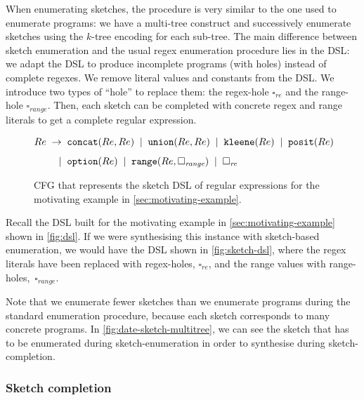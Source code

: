 When enumerating sketches, the procedure is very similar to the one used to enumerate programs: we have a multi-tree construct and successively enumerate sketches using the \(k\)-tree encoding for each sub-tree. 
The main difference between sketch enumeration and the usual regex enumeration procedure lies in the \ac{DSL}: we adapt the \ac{DSL} to produce incomplete programs (with holes) instead of complete regexes. 
We remove literal values and constants from the \ac{DSL}. We introduce two types of ``hole'' to replace them: the regex-hole \(\square_{\textit{re}}\) and the range-hole \(\square_{\textit{range}}\). Then, each sketch can be completed with concrete regex and range literals to get a complete regular expression.

\begin{figure}[t]
  \begin{align*}
    Re \;\to \;\;&  \texttt{concat}(Re, Re) \;\;|\;\;  \texttt{union}(Re, Re)   \;\;|\;\;  \texttt{kleene}(Re) \;\;|\;\;  \texttt{posit}(Re) \\[1.1ex]
          |\;\;&  \texttt{option}(Re) \;\;|\;\;  \texttt{range}(Re, \square_{\textit{range}}) \;\;|\;\; \square_{\textit{re}}
  \end{align*}
  \caption{\ac{CFG} that represents the sketch \ac{DSL} of regular expressions for the motivating example in \autoref{sec:motivating-example}. }
  \label{fig:sketch-dsl}
\end{figure}

\begin{example}
Recall the DSL built for the motivating example in \autoref{sec:motivating-example} shown in \autoref{fig:dsl}. If we were synthesising this instance with sketch-based enumeration, we would have the DSL shown in \autoref{fig:sketch-dsl}, where the regex literals have been replaced with regex-holes, \(\square_{\textit{re}}\), and the range values with range-holes,~\(\square_{\textit{range}}\).
\end{example}

\noindent
Note that we enumerate fewer sketches than we enumerate programs during the standard enumeration procedure, because each sketch corresponds to many concrete programs. In \autoref{fig:date-sketch-multitree}, we can see the sketch that has to be enumerated during sketch-enumeration in order to synthesise  during sketch-completion.



\subsubsection{Sketch completion}

